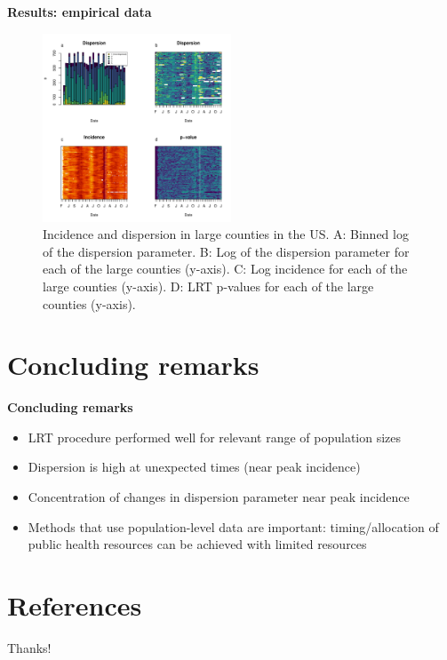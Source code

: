 \documentclass{beamer}
\begin{document}
\begin{frame}{\textbf{Results: empirical data}}
	\begin{figure}[!h]
	\includegraphics[width=0.5\textwidth]{fig2}
	\caption{
		Incidence and dispersion in large counties in the US. A: Binned log of the dispersion parameter. B: Log of the dispersion parameter for each of the large counties (y-axis). C: Log incidence for each of the large counties (y-axis). D: LRT p-values for each of the large counties (y-axis).
	}
	\label{fig2}
\end{figure}
\end{frame}

\section{Concluding remarks}
\begin{frame}{\textbf{Concluding remarks}}
    \begin{itemize}[<+->] %
            \item LRT procedure performed well for relevant range of population sizes
		\item Dispersion is high at unexpected times (near peak incidence)
            \item Concentration of changes in dispersion parameter near peak incidence
            \item Methods that use population-level data are important: timing/allocation of public health resources can be achieved with limited resources
	\end{itemize}
\end{frame}

\section{References}

\begin{frame}
{\tiny\printbibliography}
\end{frame}

\begin{frame}
	\begin{center}
		{\Huge Thanks!}
	\end{center}
\end{frame}
\end{document}
